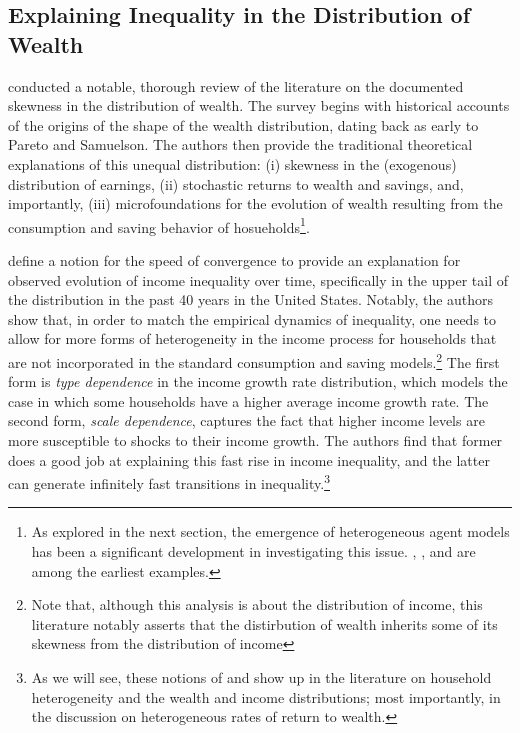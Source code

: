 \documentclass[\econtexRoot/Chp1]{subfiles}
\begin{document}
\subsection{Explaining Inequality in the Distribution of Wealth}

\par \cite{jbab18} conducted a notable, thorough review of the literature on the documented skewness in the distribution of wealth. The survey begins with historical accounts of the origins of the shape of the wealth distribution, dating back as early to Pareto and Samuelson. The authors then provide the traditional theoretical explanations of this unequal distribution: (i) skewness in the (exogenous) distribution of earnings, (ii) stochastic returns to wealth and savings, and, importantly, (iii) microfoundations for the evolution of wealth resulting from the consumption and saving behavior of hosueholds\footnote{As explored in the next section, the emergence of heterogeneous agent models has been a significant development in investigating this issue. \cite{tb1983}, \cite{ra1994}, and \cite{mh1993} are among the earliest examples.}.

\par \cite{Gabaix2016} define a notion for the speed of convergence to provide an explanation for observed evolution of income inequality over time, specifically in the upper tail of the distribution in the past 40 years in the United States. Notably, the authors show that, in order to match the empirical dynamics of inequality, one needs to allow for more forms of heterogeneity in the income process for households that are not incorporated in the standard consumption and saving models.\footnote{Note that, although this analysis is about the distribution of income, this literature notably asserts that the distirbution of wealth inherits some of its skewness from the distribution of income} The first form is \textit{type dependence} in the income growth rate distribution, which models the case in which some households have a higher average income growth rate. The second form, \textit{scale dependence}, captures the fact that higher income levels are more susceptible to shocks to their income growth. The authors find that former does a good job at explaining this fast rise in income inequality, and the latter can generate infinitely fast transitions in inequality.\footnote{As we will see, these notions of  and  show up in the literature on household heterogeneity and the wealth and income distributions; most importantly, in the discussion on heterogeneous rates of return to wealth.} 
\end{document}
